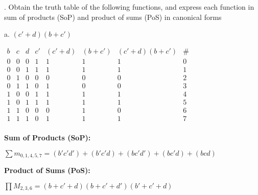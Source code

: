 \documentclass[12pt]{book}
\newenvironment{indented}[1] {
	\begin{list}{}{\setlength{\leftmargin}{#1}}
		\item[]
	}{\end{list}}
\begin{document}
	. Obtain  the  truth  table  of  the  following  functions,  and  express  each  function  in  sum of products (SoP) and product of sums (PoS) in canonical forms
	\begin{indented}{5mm}
		a. $(c' + d)(b + c')$
		\begin{indented}{5mm}
			$\begin{array}{c|c|c||c||c|c||c|c}
				b & c & d & c' & (c' + d) & (b + c') & (c' + d)(b + c') & \#\\
				\hline
				0 & 0 & 0 & 1  &    1     &    1     &        1         &  0 \\
				0 & 0 & 1 & 1  &    1     &    1     &        1         &  1 \\
				0 & 1 & 0 & 0  &    0     &    0     &        0         &  2 \\
				0 & 1 & 1 & 0  &    1     &    0     &        0         &  3 \\
				1 & 0 & 0 & 1  &    1     &    1     &        1         &  4 \\
				1 & 0 & 1 & 1  &    1     &    1     &        1         &  5 \\
				1 & 1 & 0 & 0  &    0     &    1     &        0         &  6 \\
				1 & 1 & 1 & 0  &    1     &    1     &        1         &  7 \\
			\end{array}$
			
			\textbf{Sum of Products (SoP):}
			\begin{indented}{5mm}
				$\sum m_{0, 1, 4, 5, 7} = (b'c'd')+(b'c'd)+(bc'd')+(bc'd)+(bcd)$
			\end{indented}
			
			\textbf{Product of Sums (PoS):}
			\begin{indented}{5mm}
				$\prod M_{2, 3, 6} = (b+c'+d)(b+c'+d')(b'+c'+d)$
			\end{indented}
		\end{indented}
		
		\pagebreak


\end{indented}
\end{document}

